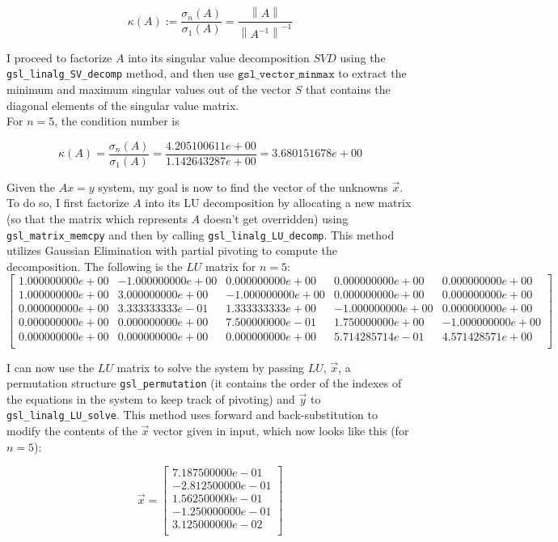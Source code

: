 \documentclass{article}
\newcommand{\code}{\texttt}
\newcommand{\norm}[1]{\left\lVert#1\right\rVert}
\begin{document}
$$\kappa(A) := \frac{\sigma_n (A)}{\sigma_1 (A)}= \frac{\norm{A}}{\norm{A^{-1}}^{-1}}$$

I proceed to factorize $A$ into its singular value decomposition $SVD$ using the \code{gsl\_linalg\_SV\_decomp} method, and then use $\code{gsl\_vector\_minmax}$ to extract the minimum and maximum singular values out of the vector $S$ that contains the diagonal elements of the singular value matrix. \\

For $n=5$, the condition number is

$$\kappa(A) = \frac{\sigma_n (A)}{\sigma_1 (A)}= \frac{4.205100611e+00}{1.142643287e+00}=3.680151678e+00$$

Given the $Ax=y$ system, my goal is now to find the vector of the unknowns $\vec{x}$. To do so, I first factorize $A$ into its LU decomposition by allocating a new matrix (so that the matrix which represents $A$ doesn't get overridden) using \code{gsl\_matrix\_memcpy} and then by calling \code{gsl\_linalg\_LU\_decomp}. This method utilizes Gaussian Elimination with partial pivoting to compute the decomposition. The following is the $LU$ matrix for $n=5$:
$$
\begin{bmatrix} 
1.000000000e+00 & -1.000000000e+00 & 0.000000000e+00 & 0.000000000e+00 & 0.000000000e+00 \\ 
1.000000000e+00 & 3.000000000e+00 & -1.000000000e+00 & 0.000000000e+00 & 0.000000000e+00 \\ 
0.000000000e+00 & 3.333333333e-01 & 1.333333333e+00 & -1.000000000e+00 & 0.000000000e+00 \\
0.000000000e+00 & 0.000000000e+00 & 7.500000000e-01 & 1.750000000e+00 & -1.000000000e+00 \\ 
0.000000000e+00 & 0.000000000e+00 & 0.000000000e+00 & 5.714285714e-01 & 4.571428571e+00 \\
\end{bmatrix}
$$

I can now use the $LU$ matrix to solve the system by passing $LU$, $\vec{x}$, a permutation structure \code{gsl\_permutation} (it contains the order of the indexes of the equations in the system to keep track of pivoting) and $\vec{y}$ to \code{gsl\_linalg\_LU\_solve}. This method uses forward and back-substitution to modify the contents of the $\vec{x}$ vector given in input, which now looks like this (for $n=5$):

$$
\vec{x}=
\begin{bmatrix}
7.187500000e-01\\
-2.812500000e-01\\
1.562500000e-01\\
-1.250000000e-01\\
3.125000000e-02\\
\end{bmatrix}
$$
\end{document}
